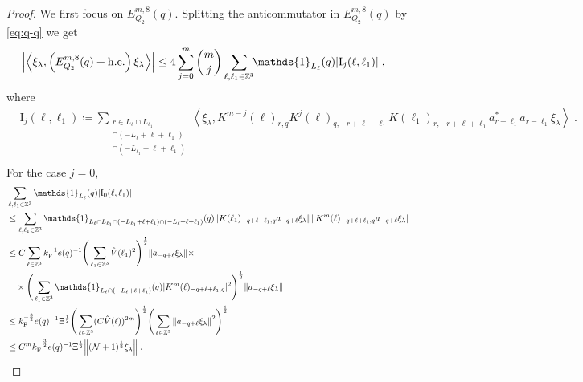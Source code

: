 \documentclass[12pt,a4paper]{article}
\numberwithin{equation}{section}
\newcommand{\1}{\mathbb{I}}
\newcommand{\F}{\mathrm{F}}
\newcommand{\I}{\mathrm{I}}
\newcommand{\Zstar}{\mathbb{Z}^3} %
\newcommand{\Z}{\mathbb{Z}}
\newcommand{\NN}{\mathcal{N}}
\newcommand{\half}{\frac{1}{2}}
\newcommand{\eva}[1]{\left\langle #1 \right\rangle}
\theoremstyle{plain}
\theoremstyle{definition}
\theoremstyle{remark}
\theoremstyle{plain}
\theoremstyle{definition}
\theoremstyle{remark}
\begin{document}
\begin{proof}
We first focus on $ E^{m,8}_{Q_2}(q) $.
Splitting the anticommutator in $ E^{m,8}_{Q_2}(q) $ by \eqref{eq:q-q} we get
\begin{equation} \label{eq:EQ2181}
\begin{aligned}
	& \abs{\eva{\xi_\lambda,\left(E^{m,8}_{Q_2}(q) + \mathrm{h.c.}\right) \xi_\lambda }}
	\le 4 \sum_{j=0}^m {{m}\choose j} \sum_{\ell,\ell_1 \in \Zstar}\!\! \mathds{1}_{L_\ell}(q) |\I_j(\ell, \ell_1)| \;,
	\end{aligned}
\end{equation}
where
\begin{equation}
\begin{aligned}
	& \I_j(\ell, \ell_1)
	\coloneq \sum_{\substack{r\in L_{\ell} \cap L_{\ell_1}\\\cap (-L_{\ell}+\ell+\ell_1) \\ \cap (-L_{\ell_1}+\ell+\ell_1)}}
		\eva{\xi_\lambda, K^{m-j}(\ell)_{r,q} K^{j}(\ell)_{q,-r+\ell+\ell_1} K(\ell_1)_{r,-r+\ell+\ell_1} a^*_{r-\ell_1} a_{r-\ell_1} \xi_\lambda} \;. \\
\end{aligned}
\end{equation}
For the case $ j = 0 $,
\begin{align}
	&\sum_{\ell,\ell_1 \in \Zstar} \mathds{1}_{L_\ell}(q) |\I_0(\ell, \ell_1)| \nonumber\\
	&\leq \sum_{\ell,\ell_1 \in \Zstar} \mathds{1}_{L_\ell \cap L_{\ell_1} \cap (-L_{\ell_1} + \ell + \ell_1) \cap (-L_\ell + \ell + \ell_1)}(q)
		\norm{ K(\ell_1)_{-q+\ell+\ell_1,q} a_{-q+\ell} \xi_\lambda}
		\norm{ K^m(\ell)_{-q+\ell+\ell_1,q} a_{-q+\ell} \xi_\lambda } \nonumber\\
	&\leq C \sum_{\ell \in \Zstar} k_{\F}^{-1} e(q)^{-1}
		\Bigg( \sum_{\ell_1 \in \Zstar} \hat{V}(\ell_1)^2 \Bigg)^{\half}
		\norm{ a_{-q+\ell} \xi_\lambda} \times \nonumber\\
	&\quad \times \Bigg( \sum_{\ell_1 \in \Zstar} \mathds{1}_{L_\ell \cap (-L_\ell + \ell + \ell_1)}(q) |K^m(\ell)_{-q+\ell+\ell_1,q}|^2 \Bigg)^{\half}
		\norm{ a_{-q+\ell} \xi_\lambda } \nonumber\\
	&\leq k_{\F}^{-\frac 32} e(q)^{-1} \Xi^\half
		\Bigg( \sum_{\ell \in \Zstar} (C \hat{V}(\ell))^{2m} \Bigg)^{\half}
		\Bigg( \sum_{\ell \in \Z^3} \norm{a_{-q+\ell} \xi_\lambda }^2 \Bigg)^{\half} \nonumber\\
	&\leq C^m k_{\F}^{-\frac 32} e(q)^{-1} \Xi^{\half} \norm{(\NN+1)^{\half} \xi_\lambda} \;. \label{eq:estEQ2181}

\end{align}
\end{proof}
\end{document}
